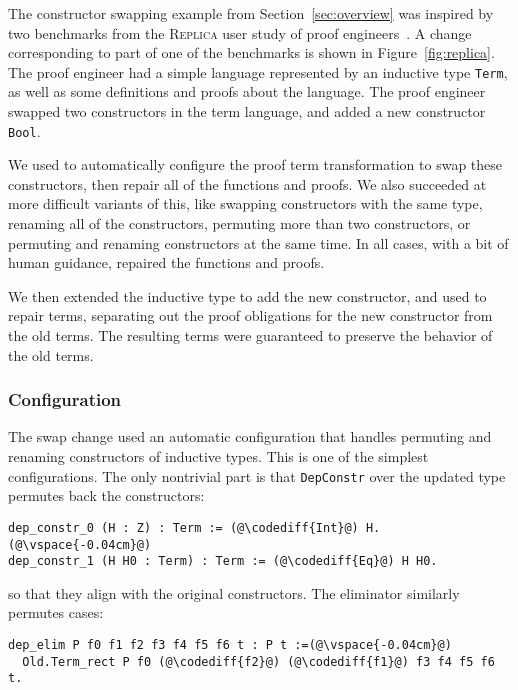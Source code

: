 The constructor swapping example from Section~\ref{sec:overview} was inspired by two benchmarks 
from the \textsc{Replica} user study of proof engineers~\cite{replica}.
A change corresponding to part of one of the benchmarks is shown in Figure~\ref{fig:replica}.
The proof engineer had a simple language represented by an inductive type \lstinline{Term},
as well as some definitions and proofs about the language.
The proof engineer swapped two constructors in the term language,
and added a new constructor \lstinline{Bool}.

We used \toolname to automatically configure the proof term transformation to swap these constructors,
then repair all of the functions and proofs.
We also succeeded at more difficult variants of this,
like swapping constructors with the same type, renaming all of the constructors,
permuting more than two constructors,
or permuting and renaming constructors at the same time.
In all cases, with a bit of human guidance, \toolname repaired the functions and proofs.

We then extended the inductive type to add the new constructor, and used \toolname to repair terms,
separating out the proof obligations for the new constructor from the old terms.
The resulting terms were guaranteed to preserve the behavior of the old terms.

\subsubsection{Configuration}

The swap change used an automatic configuration that handles permuting and renaming constructors of inductive types.
This is one of the simplest configurations.
The only nontrivial part is that \lstinline{DepConstr} over the updated type permutes back the constructors:

\begin{lstlisting}[backgroundcolor=\color{cyan!30}]
dep_constr_0 (H : Z) : Term := (@\codediff{Int}@) H.(@\vspace{-0.04cm}@)
dep_constr_1 (H H0 : Term) : Term := (@\codediff{Eq}@) H H0.
\end{lstlisting}
so that they align with the original constructors.
The eliminator similarly permutes cases:

\begin{lstlisting}[backgroundcolor=\color{cyan!30}]
dep_elim P f0 f1 f2 f3 f4 f5 f6 t : P t :=(@\vspace{-0.04cm}@)
  Old.Term_rect P f0 (@\codediff{f2}@) (@\codediff{f1}@) f3 f4 f5 f6 t.
\end{lstlisting}

